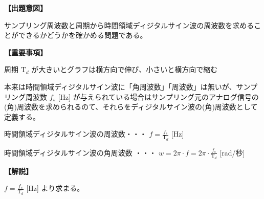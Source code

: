 \noindent \textbf{【出題意図】}

\bigskip
\noindent サンプリング周波数と周期から時間領域ディジタルサイン波の周波数を求めることができるかどうかを確かめる問題である。

\vspace{1em}
\noindent \textbf{【重要事項】}

\bigskip
\noindent 周期 $\textrm{T}_d$ が大きいとグラフは横方向で伸び、小さいと横方向で縮む

\bigskip
\noindent 本来は時間領域ディジタルサイン波に「角周波数」「周波数」は無いが、サンプリング周波数 $f_s$ [Hz] が与えられている場合はサンプリング元のアナログ信号の(角)周波数を求められるのて、それらをディジタルサイン波の(角)周波数として定義する。

\bigskip
\noindent 時間領域ディジタルサイン波の周波数・・・ $f = \frac{f_s}{\textrm{T}_d}$ [Hz]

\bigskip
\noindent 時間領域ディジタルサイン波の角周波数 ・・・ $w = 2\pi \cdot f = 2 \pi \cdot \frac{f_s}{\textrm{T}_d}$ [rad/秒]

\bigskip

\vspace{1em}
\noindent \textbf{【解説】}

\bigskip
\noindent $f = \frac{f_s}{\textrm{T}_d}$ [Hz] より求まる。
